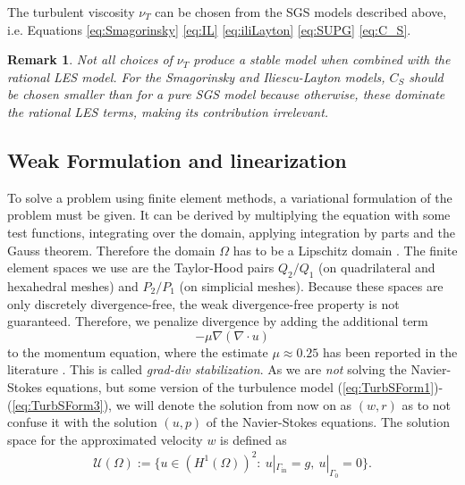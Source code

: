\documentclass[a4paper, 11pt, twoside]{article}
\newtheorem{remark}{Remark}[section]
\begin{document}
The turbulent viscosity $\nu_T$ can be chosen from the SGS models described above, i.e. Equations \ref{eq:Smagorinsky} \ref{eq:IL} \ref{eq:iliLayton} \ref{eq:SUPG} \ref{eq:C_S}.

\begin{remark}
Not all choices of $\nu_T$ produce a stable model when combined with the rational LES model. For the Smagorinsky and Iliescu-Layton models, $C_S$ should be chosen smaller than for a pure SGS model because otherwise, these dominate the rational LES terms, making its contribution irrelevant.
\end{remark}

\subsection{Weak Formulation and linearization}
To solve a problem using finite element methods, a variational formulation of the problem must be given. 
It can be derived by multiplying the equation with some test functions, integrating over the domain, applying integration by parts and the Gauss theorem. 
Therefore the domain $\Omega$ has to be a Lipschitz domain \cite[p.89-96]{mclean}. The finite element spaces we use are the Taylor-Hood pairs $Q_2/Q_1$ (on quadrilateral and hexahedral meshes) and $P_2/P_1$ (on simplicial meshes). Because these spaces are only discretely divergence-free, the weak divergence-free property is not guaranteed. Therefore, we penalize divergence by adding the additional term 
\begin{equation}
    -\mu \nabla(\nabla \cdot u)
\end{equation} 
to the momentum equation, where the estimate $\mu \approx 0.25$ has been reported in the literature \cite{deFrutos2016}. This is called \textit{grad-div stabilization}.
As we are \textit{not} solving the Navier-Stokes equations, but some version of the turbulence model (\ref{eq:TurbSForm1})-(\ref{eq:TurbSForm3}), we will denote the solution from now on as $(w,r)$ as to not confuse it with the solution $(u,p)$ of the Navier-Stokes equations.
The solution space for the approximated velocity $w$ is defined as 
\begin{align*}
 \mathcal{U}(\Omega) := \{ u\in (H^1(\Omega))^2: \ u|_{\Gamma_{\text{in}}} = g ,
\ u|_{\Gamma_0}= 0 \}.
\end{align*}
\end{document}
